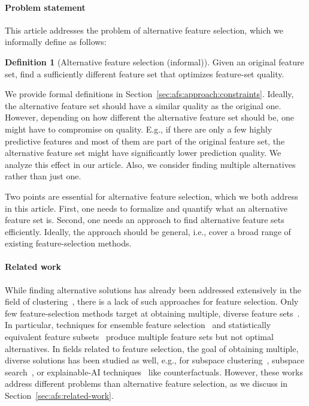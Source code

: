 \documentclass{article}
\theoremstyle{definition}
\newtheorem{definition}[corollary]{Definition}
\begin{document}
\paragraph{Problem statement}

This article addresses the problem of alternative feature selection, which we informally define as follows:
%
\begin{definition}[Alternative feature selection (informal)]
	Given an original feature set, find a sufficiently different feature set that optimizes feature-set quality.
	\label{def:afs:alternative-feature-selection}
\end{definition}
%
We provide formal definitions in Section~\ref{sec:afs:approach:constraints}.
Ideally, the alternative feature set should have a similar quality as the original one.
However, depending on how different the alternative feature set should be, one might have to compromise on quality.
E.g., if there are only a few highly predictive features and most of them are part of the original feature set, the alternative feature set might have significantly lower prediction quality.
We analyze this effect in our article.
Also, we consider finding multiple alternatives rather than just one.

Two points are essential for alternative feature selection, which we both address in this article.
First, one needs to formalize and quantify what an alternative feature set is.
Second, one needs an approach to find alternative feature sets efficiently.
Ideally, the approach should be general, i.e., cover a broad range of existing feature-selection methods.

\paragraph{Related work}

While finding alternative solutions has already been addressed extensively in the field of clustering~\cite{bailey2014alternative}, there is a lack of such approaches for feature selection.
Only few feature-selection methods target at obtaining multiple, diverse feature sets~\cite{borboudakis2021extending, siddiqi2020genetic}.
In particular, techniques for ensemble feature selection~\cite{saeys2008robust, seijo2017ensemble} and statistically equivalent feature subsets~\cite{lagani2017feature} produce multiple feature sets but not optimal alternatives.
In fields related to feature selection, the goal of obtaining multiple, diverse solutions has been studied as well, e.g., for subspace clustering~\cite{mueller2009relevant}, subspace search~\cite{trittenbach2019dimension}, or explainable-AI techniques~\cite{artelt2022even, kim2016examples, mothilal2020explaining, russell2019efficient} like counterfactuals.
However, these works address different problems than alternative feature selection, as we discuss in Section~\ref{sec:afs:related-work}.
\end{document}
